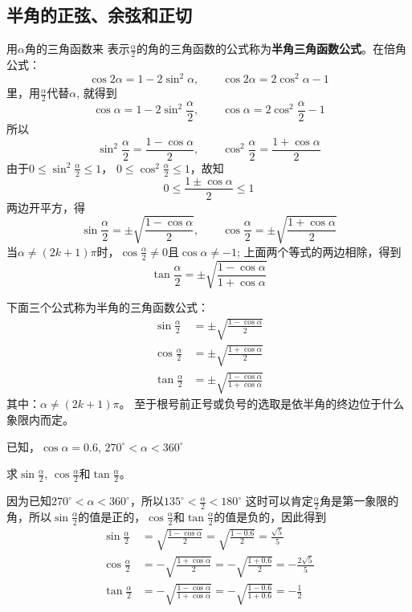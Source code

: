 \subsection{半角的正弦、余弦和正切}

用$\alpha$角的三角函数来
表示$\frac{\alpha}{2}$的角的三角函数的公式称为\textbf{半角三角函数公式}。在倍角公式：
\[\cos2\alpha=1-2\sin^2\alpha,\qquad \cos2\alpha=2\cos^2\alpha-1\]
里，用$\frac{\alpha}{2}$代替$\alpha$, 就得到
\[\cos\alpha=1-2\sin^2\frac{\alpha}{2},\qquad \cos\alpha=2\cos^2\frac{\alpha}{2}-1\]
所以
\[\sin^2\frac{\alpha}{2}=\frac{1-\cos\alpha}{2},\qquad \cos^2\frac{\alpha}{2}=\frac{1+\cos\alpha}{2}\]
由于$0\le \sin^2 \frac{\alpha}{2}\le 1$，
$0\le \cos^2\frac{\alpha}{2}\le 1$，故知
\[0\le \frac{1\pm\cos\alpha}{2}\le 1\]
两边开平方，得
\[\sin\frac{\alpha}{2}=\pm\sqrt{\frac{1-\cos\alpha}{2}},\qquad \cos\frac{\alpha}{2}=\pm\sqrt{\frac{1+\cos\alpha}{2}}\]
当$\alpha\ne(2k+1)\pi$时，$\cos\frac{\alpha}{2}\ne 0$且$\cos\alpha\ne -1$; 上面两个等式的两边相除，得到
\[\tan\frac{\alpha}{2}=\pm\sqrt{\frac{1-\cos\alpha}{1+\cos\alpha}}\]

下面三个公式称为半角的三角函数公式：
\begin{align}
    \sin\frac{\alpha}{2}&=\pm\sqrt{\frac{1-\cos\alpha}{2}}\\
     \cos\frac{\alpha}{2}&=\pm\sqrt{\frac{1+\cos\alpha}{2}}\\
     \tan\frac{\alpha}{2}&=\pm\sqrt{\frac{1-\cos\alpha}{1+\cos\alpha}}
\end{align}
其中：$\alpha\ne (2k+1)\pi$。
至于根号前正号或负号的选取是依半角的终边位于什么象限内而定。

\begin{example}
已知，$\cos\alpha=0.6$, $270^{\circ}<\alpha<360^{\circ}$

求$\sin \frac{\alpha}{2}$, $\cos\frac{\alpha}{2}$和$\tan \frac{\alpha}{2}$。
\end{example}

\begin{solution}
因为已知$270^{\circ}<\alpha<360^{\circ}$，所以$135^{\circ}<\frac{\alpha}{2}<180^{\circ}$
这时可以肯定$\frac{\alpha}{2}$角是第一象限的角，所以$\sin \frac{\alpha}{2}$的值是正的，$\cos\frac{\alpha}{2}$和$\tan \frac{\alpha}{2}$的值是负的，因此得到
\[\begin{split}
    \sin\frac{\alpha}{2}&=\sqrt{\frac{1-\cos\alpha}{2}}=\sqrt{\frac{1-0.6}{2}}=\frac{\sqrt{5}}{5}\\
     \cos\frac{\alpha}{2}&=-\sqrt{\frac{1+\cos\alpha}{2}}=-\sqrt{\frac{1+0.6}{2}}=-\frac{2\sqrt{5}}{5}\\
     \tan\frac{\alpha}{2}&=-\sqrt{\frac{1-\cos\alpha}{1+\cos\alpha}}=-\sqrt{\frac{1-0.6}{1+0.6}}=-\frac{1}{2}
\end{split}\]
\end{solution}

